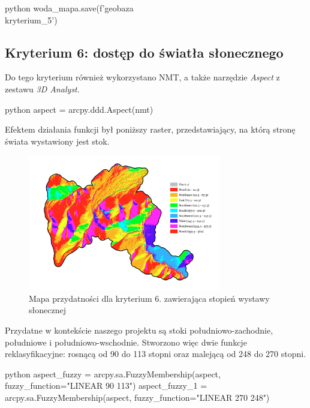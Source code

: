 \documentclass{article}
\begin{document}
\begin{mintedbox}{python}
woda_mapa.save(f'{geobaza}\\kryterium_5')
\end{mintedbox}
\newpage

\subsection{Kryterium 6: dostęp do światła słonecznego}

Do tego kryterium również wykorzystano NMT, a także narzędzie \textit{Aspect} z zestawu \textit{3D Analyst}.
\vspace{5pt}

\begin{mintedbox}{python}
aspect = arcpy.ddd.Aspect(nmt)
\end{mintedbox}
\vspace{10pt}

Efektem działania funkcji był poniższy raster, przedstawiający, na którą stronę świata wystawiony jest stok.
\vspace{5pt}

\begin{figure}[H]
    \centering
    \includegraphics[width=0.75\textwidth]{img/kryterium6-aspect.jpg}
    \caption{Mapa przydatności dla kryterium 6. zawierająca stopień wystawy słonecznej}
\end{figure}
\vspace{10pt}

Przydatne w kontekście naszego projektu są stoki południowo-zachodnie, południowe i południowo-wschodnie. Stworzono więc dwie funkcje reklasyfikacyjne: rosnącą od 90 do 113 stopni oraz malejącą od 248 do 270 stopni. 
\vspace{5pt}

\begin{mintedbox}{python}
aspect_fuzzy = arcpy.sa.FuzzyMembership(aspect, fuzzy_function="LINEAR 90 113")
aspect_fuzzy_1 = arcpy.sa.FuzzyMembership(aspect, fuzzy_function="LINEAR 270 248")
\end{mintedbox}
\vspace{10pt}
\end{document}

